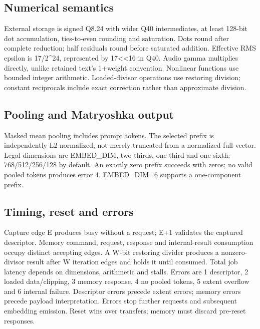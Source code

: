 \documentclass[11pt,a4paper]{article}
\begin{document}
\subsection{Numerical semantics}

External storage is signed Q8.24 with wider Q40 intermediates,\allowbreak{} at least 128-bit dot accumulation,\allowbreak{} ties-to-even rounding and saturation. Dots round after complete reduction; half residuals round before saturated addition. Effective RMS epsilon is 17/\allowbreak{}2\textasciicircum{}24,\allowbreak{} represented by 17<<16 in Q40. Audio gamma multiplies directly,\allowbreak{} unlike retained text's 1+\allowbreak{}weight convention. Nonlinear functions use bounded integer arithmetic. Loaded-divisor operations use restoring division; constant reciprocals include exact correction rather than approximate division.

\subsection{Pooling and Matryoshka output}

Masked mean pooling includes prompt tokens. The selected prefix is independently L2-normalized,\allowbreak{} not merely truncated from a normalized full vector. Legal dimensions are EMBED\_\allowbreak{}DIM,\allowbreak{} two-thirds,\allowbreak{} one-third and one-sixth: 768/\allowbreak{}512/\allowbreak{}256/\allowbreak{}128 by default. An exactly zero prefix succeeds with zeros; no valid pooled tokens produces error 4. EMBED\_\allowbreak{}DIM=\allowbreak{}6 supports a one-component prefix.

\subsection{Timing,\allowbreak{} reset and errors}

Capture edge E produces busy without a request; E+\allowbreak{}1 validates the captured descriptor. Memory command,\allowbreak{} request,\allowbreak{} response and internal-result consumption occupy distinct accepting edges. A W-bit restoring divider produces a nonzero-divisor result after W iteration edges and holds it until consumed. Total job latency depends on dimensions,\allowbreak{} arithmetic and stalls. Errors are 1 descriptor,\allowbreak{} 2 loaded data/\allowbreak{}clipping,\allowbreak{} 3 memory response,\allowbreak{} 4 no pooled tokens,\allowbreak{} 5 extent overflow and 6 internal failure. Descriptor errors precede extent errors; memory errors precede payload interpretation. Errors stop further requests and subsequent embedding emission. Reset wins over transfers; memory must discard pre-reset responses.
\end{document}
